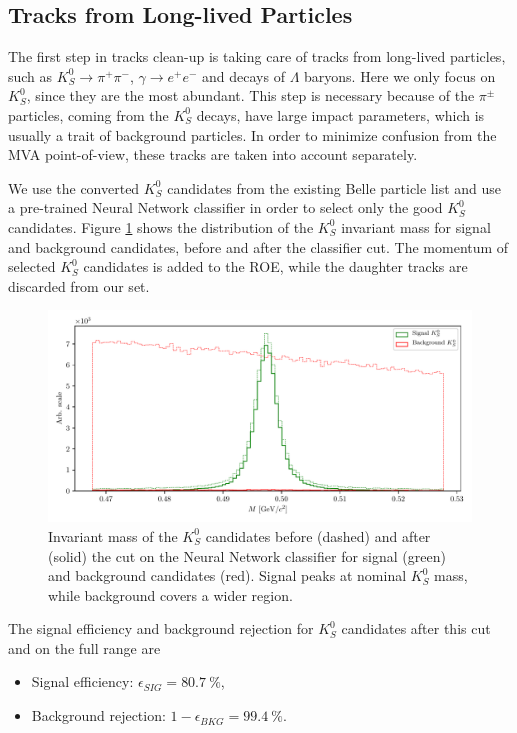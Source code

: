\subsection{Tracks from Long-lived Particles}

The first step in tracks clean-up is taking care of tracks from long-lived particles, such as $K_S^0 \to \pi^+\pi^-$, $\gamma \to e^+ e^-$ and decays of $\Lambda$ baryons. Here we only focus on $K_S^0$, since they are the most abundant. This step is necessary because of the $\pi^\pm$ particles, coming from the $K_S^0$ decays, have large impact parameters, which is usually a trait of background particles. In order to minimize confusion from the MVA point-of-view, these tracks are taken into account separately.

We use the converted $K_S^0$ candidates from the existing Belle particle list and use a pre-trained Neural Network classifier in order to select only the good $K_S^0$ candidates. Figure \ref{fig:ROE_V0} shows the distribution of the $K_S^0$ invariant mass for signal and background candidates, before and after the classifier cut. The momentum of selected $K_S^0$ candidates is added to the ROE, while the daughter tracks are discarded from our set.

\begin{figure}[H]
	\centering
	\captionsetup{width=0.8\linewidth}
	\includegraphics[width=\linewidth]{fig/ROECleanup_V0}
	\caption{Invariant mass of the $K_S^0$ candidates before (dashed) and after (solid) the cut on the Neural Network classifier for signal (green) and background candidates (red). Signal peaks at nominal $K_S^0$ mass, while background covers a wider region.}
	\label{fig:ROE_V0}
\end{figure}

The signal efficiency and background rejection for $K_S^0$ candidates after this cut and on the full range are
\begin{itemize}
	\item Signal efficiency: $\epsilon_{SIG} = 80.7~\%$,
	\item Background rejection: $1-\epsilon_{BKG} = 99.4~\%$.
\end{itemize}

